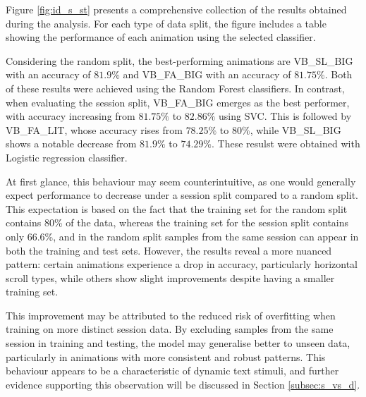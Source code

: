 \documentclass{article}
\begin{document}
Figure \ref{fig:id_s_st} presents a comprehensive collection of the results obtained during the analysis. 
For each type of data split, the figure includes a table showing the performance of each animation using the selected classifier.

Considering the random split, the best-performing animations are VB\_SL\_BIG with an accuracy of $81.9\%$ and VB\_FA\_BIG with an accuracy of $81.75\%$.
Both of these results were achieved using the Random Forest classifiers. 
In contrast, when evaluating the session split, VB\_FA\_BIG emerges as the best performer, with accuracy increasing from $81.75\%$ to $82.86\%$ using SVC. 
This is followed by VB\_FA\_LIT, whose accuracy rises from $78.25\%$ to $80\%$, while VB\_SL\_BIG shows a notable decrease from $81.9\%$ to $74.29\%$.
These resulst were obtained with Logistic regression classifier.

At first glance, this behaviour may seem counterintuitive, as one would generally expect performance to decrease under a session split compared to a random split. 
This expectation is based on the fact that the training set for the random split contains 80\% of the data, whereas the training set for the session split contains only 66.6\%, and in the random split samples from the same session can appear in both the training and test sets. 
However, the results reveal a more nuanced pattern: certain animations experience a drop in accuracy, particularly horizontal scroll types, while others show slight improvements despite having a smaller training set.

This improvement may be attributed to the reduced risk of overfitting when training on more distinct session data. 
By excluding samples from the same session in training and testing, the model may generalise better to unseen data, particularly in animations with more consistent and robust patterns. 
This behaviour appears to be a characteristic of dynamic text stimuli, and further evidence supporting this observation will be discussed in Section \ref{subsec:s_vs_d}.
\end{document}
